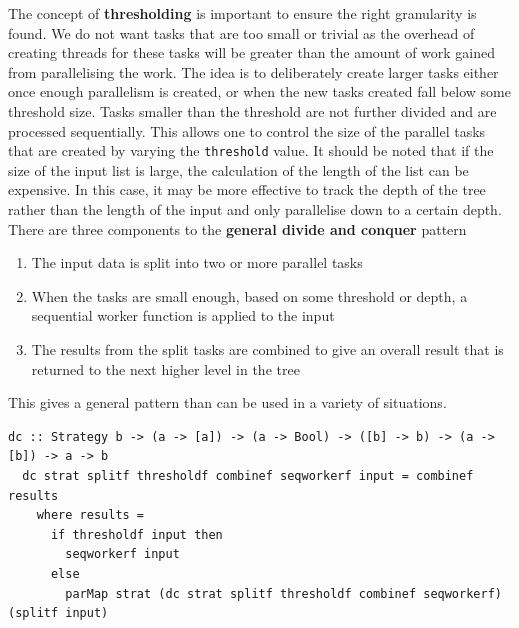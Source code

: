 \documentclass[CS4204-Notes.tex]{subfiles}
\begin{document}
The concept of \textbf{thresholding} is important to ensure the right granularity is found. We do not want tasks that are too small or trivial as the overhead of creating threads for these tasks will be greater than the amount of work gained from parallelising the work. The idea is to deliberately create larger tasks either once enough parallelism is created, or when the new tasks created fall below some threshold size. Tasks smaller than the threshold are not further divided and are processed sequentially.
\n
This allows one to control the size of the parallel tasks that are created by varying the \texttt{threshold} value. It should be noted that if the size of the input list is large, the calculation of the length of the list can be expensive. In this case, it may be more effective to track the depth of the tree rather than the length of the input and only parallelise down to a certain depth.
\n
There are three components to the \textbf{general divide and conquer} pattern
\begin{enumerate}
\item The input data is split into two or more parallel tasks
\item When the tasks are small enough, based on some threshold or depth, a sequential worker function is applied to the input
\item The results from the split tasks are combined to give an overall result that is returned to the next higher level in the tree
\end{enumerate}
This gives a general pattern than can be used in a variety of situations.
\begin{lstlisting}[caption={A general divide and conquer pattern}]
  dc :: Strategy b -> (a -> [a]) -> (a -> Bool) -> ([b] -> b) -> (a -> [b]) -> a -> b
  dc strat splitf thresholdf combinef seqworkerf input = combinef results
    where results =
      if thresholdf input then
        seqworkerf input
      else
        parMap strat (dc strat splitf thresholdf combinef seqworkerf) (splitf input)
\end{lstlisting}
\end{document}
